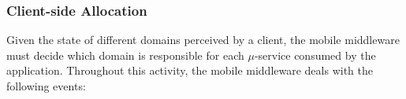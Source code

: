 




\subsubsection*{Client-side Allocation}

Given the state of different domains perceived by a client, the mobile middleware must decide which domain is responsible for each $\mu$-service consumed by the application. Throughout this activity, the mobile middleware deals with the following events:


